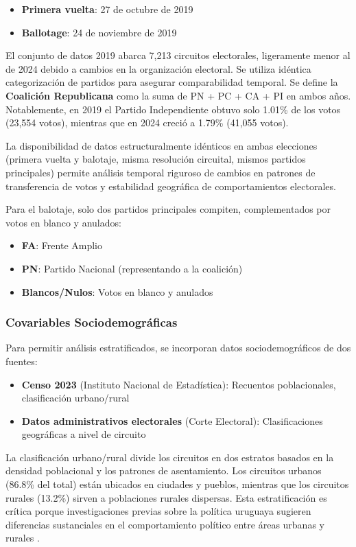\begin{itemize}
    \item \textbf{Primera vuelta}: 27 de octubre de 2019
    \item \textbf{Ballotage}: 24 de noviembre de 2019
\end{itemize}

El conjunto de datos 2019 abarca 7,213 circuitos electorales, ligeramente menor al de 2024 debido a cambios en la organización electoral. Se utiliza idéntica categorización de partidos para asegurar comparabilidad temporal. Se define la \textbf{Coalición Republicana} como la suma de PN + PC + CA + PI en ambos años. Notablemente, en 2019 el Partido Independiente obtuvo solo 1.01\% de los votos (23,554 votos), mientras que en 2024 creció a 1.79\% (41,055 votos).

La disponibilidad de datos estructuralmente idénticos en ambas elecciones (primera vuelta y balotaje, misma resolución circuital, mismos partidos principales) permite análisis temporal riguroso de cambios en patrones de transferencia de votos y estabilidad geográfica de comportamientos electorales.

Para el balotaje, solo dos partidos principales compiten, complementados por votos en blanco y anulados:
\begin{itemize}
    \item \textbf{FA}: Frente Amplio
    \item \textbf{PN}: Partido Nacional (representando a la coalición)
    \item \textbf{Blancos/Nulos}: Votos en blanco y anulados
\end{itemize}

\subsubsection{Covariables Sociodemográficas}

Para permitir análisis estratificados, se incorporan datos sociodemográficos de dos fuentes:

\begin{itemize}
    \item \textbf{Censo 2023} (Instituto Nacional de Estadística): Recuentos poblacionales, clasificación urbano/rural
    \item \textbf{Datos administrativos electorales} (Corte Electoral): Clasificaciones geográficas a nivel de circuito
\end{itemize}

La clasificación urbano/rural divide los circuitos en dos estratos basados en la densidad poblacional y los patrones de asentamiento. Los circuitos urbanos (86.8\% del total) están ubicados en ciudades y pueblos, mientras que los circuitos rurales (13.2\%) sirven a poblaciones rurales dispersas. Esta estratificación es crítica porque investigaciones previas sobre la política uruguaya sugieren diferencias sustanciales en el comportamiento político entre áreas urbanas y rurales \cite{manacorda2011transfers}.

